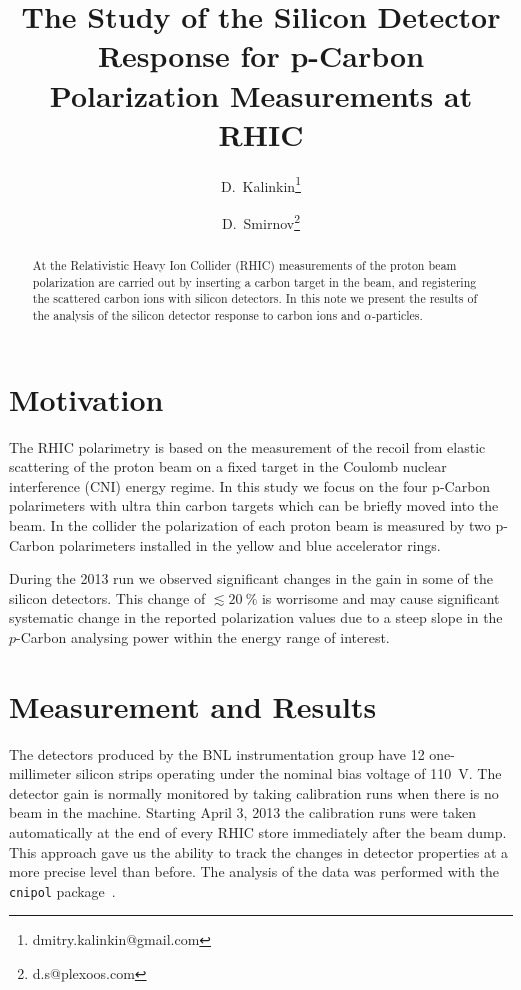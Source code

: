 \documentclass[a4paper,12pt]{article}
\title{The Study of the Silicon Detector Response for p-Carbon Polarization Measurements at RHIC}
\author[1]{D.~Kalinkin\thanks{dmitry.kalinkin@gmail.com}}
\author[2]{D.~Smirnov\thanks{d.s@plexoos.com}}
\affil[1]{Institute for Theoretical and Experimental Physics}
\affil[2]{Brookhaven National Laboratory}
\begin{document}
\maketitle

\begin{abstract}

At the Relativistic Heavy Ion Collider (RHIC) measurements of the proton beam
polarization are carried out by inserting a carbon target in the beam, and
registering the scattered carbon ions with silicon detectors. In this note we
present the results of the analysis of the silicon detector response to carbon
ions and $\alpha$-particles.

\end{abstract}


\section{Motivation}

The RHIC polarimetry is based on the measurement of the recoil from elastic
scattering of the proton beam on a fixed target in the Coulomb nuclear
interference (CNI) energy regime. In this study we focus on the four p-Carbon
polarimeters with ultra thin carbon targets which can be briefly moved into the
beam. In the collider the polarization of each proton beam is measured by two
p-Carbon polarimeters installed in the yellow and blue accelerator rings.

During the 2013 run we observed significant changes in the gain in some of the
silicon detectors. This change of $\lesssim 20~\%$ is worrisome and may cause
significant systematic change in the reported polarization values due to a steep
slope in the $p$-Carbon analysing power within the energy range of interest.


\section{Measurement and Results}

The detectors produced by the BNL instrumentation group have 12 one-millimeter
silicon strips operating under the nominal bias voltage of 110~V. The detector
gain is normally monitored by taking calibration runs when there is no beam in
the machine. Starting April 3, 2013 the calibration runs were taken
automatically at the end of every RHIC store immediately after the beam dump.
This approach gave us the ability to track the changes in detector properties at
a more precise level than before. The analysis of the data was performed with
the {\tt cnipol} package~\cite{cnipol_code}.
\end{document}
